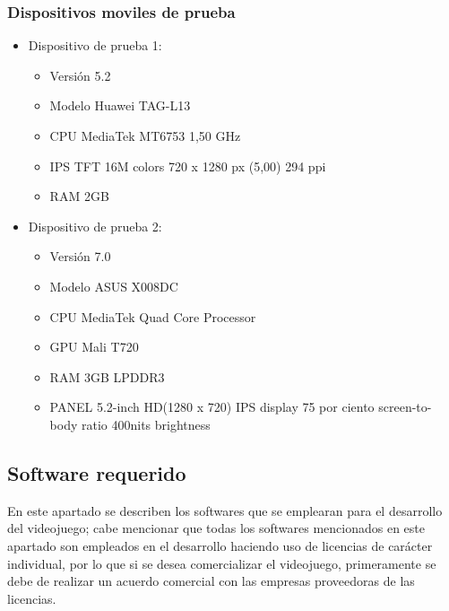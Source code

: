  	\subsubsection{Dispositivos moviles de prueba}
 		\begin{itemize}   		
			\item Dispositivo de prueba 1:
		   		\begin{itemize}
		   			\item Versión 5.2
		   			\item Modelo Huawei TAG-L13
		   			\item CPU MediaTek MT6753 1,50 GHz
		   			\item IPS TFT 16M colors 720 x 1280 px (5,00) 294 ppi
		   			\item RAM 2GB	   			
		   		\end{itemize}
   		
   			\item Dispositivo de prueba 2:
		   		\begin{itemize}
		   			\item Versión 7.0
		   			\item Modelo ASUS X008DC
		   			\item CPU MediaTek Quad Core Processor
		   			\item GPU Mali T720
		   			\item RAM 3GB LPDDR3
		   			\item PANEL 5.2-inch
		   			HD(1280 x 720) IPS display 
		   			75 por ciento screen-to-body ratio
		   			400nits brightness 
		   		\end{itemize}   		  		
   		\end{itemize}


\subsection{Software requerido}
En este apartado se describen los softwares que se emplearan para el desarrollo 
del videojuego; cabe mencionar que todas los softwares mencionados en este apartado 
son empleados en el desarrollo haciendo uso de licencias de carácter individual, 
por lo que si se desea comercializar el videojuego, primeramente se debe de realizar  
un acuerdo comercial con las empresas proveedoras de las licencias. 
 
